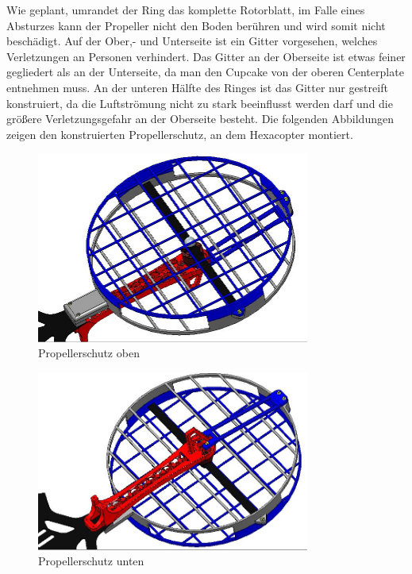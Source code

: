 	Wie geplant, umrandet der Ring das komplette Rotorblatt, im Falle eines Absturzes kann der Propeller nicht den Boden berühren und wird somit nicht beschädigt.
	Auf der Ober,- und Unterseite ist ein Gitter vorgesehen, welches Verletzungen an Personen verhindert.
	Das Gitter an der Oberseite ist etwas feiner gegliedert als an der Unterseite, da man den Cupcake von der oberen Centerplate entnehmen muss.
	An der unteren Hälfte des Ringes ist das Gitter nur gestreift konstruiert, da die Luftströmung nicht zu stark beeinflusst werden darf und die größere Verletzungsgefahr an der Oberseite besteht.
	Die folgenden Abbildungen zeigen den konstruierten Propellerschutz, an dem Hexacopter montiert.

			\begin{figure}[tbh]
			\begin{centering}
			\includegraphics[width = 0.8\textwidth]{Bilder/propellerschutz_gesamt_oben}
			\par\end{centering}
			\caption{Propellerschutz oben}
			\label{propellerschutz_gesamt_oben}
			\end{figure}

			\begin{figure}[H]
			\begin{centering}
			\includegraphics[width = 0.8\textwidth]{Bilder/propellerschutz_gesamt_unten}
			\par\end{centering}
			\caption{Propellerschutz unten}
			\label{propellerschutz_gesamt_unten}
			\end{figure}

